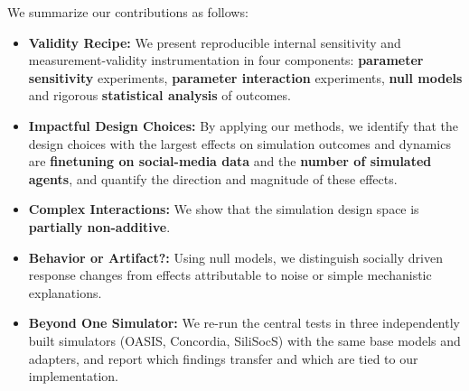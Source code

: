 \documentclass[letterpaper]{article} %
\begin{document}

We summarize our contributions as follows:
\begin{itemize}
\item \textbf{Validity Recipe:}  We present reproducible internal sensitivity and measurement-validity instrumentation in four components: \textbf{parameter sensitivity} experiments, \textbf{parameter interaction} experiments, \textbf{null models} and rigorous \textbf{statistical analysis} of outcomes.
\item \textbf{Impactful Design Choices:} By applying our methods, we identify that the design choices with the largest effects on simulation outcomes and dynamics are \textbf{finetuning on social-media data} and the \textbf{number of simulated agents}, and quantify the direction and magnitude of these effects.
\item \textbf{Complex Interactions:} We show that the simulation design space is \textbf{partially non-additive}.
\item \textbf{Behavior or Artifact?:}  Using null models, we distinguish socially driven response changes from effects attributable to noise or simple mechanistic explanations.
\item \textbf{Beyond One Simulator:} We re-run the central tests in three independently built simulators (OASIS, Concordia, SiliSocS) with the same base models and adapters, and report which findings transfer and which are tied to our implementation.
\end{itemize}
\end{document}
